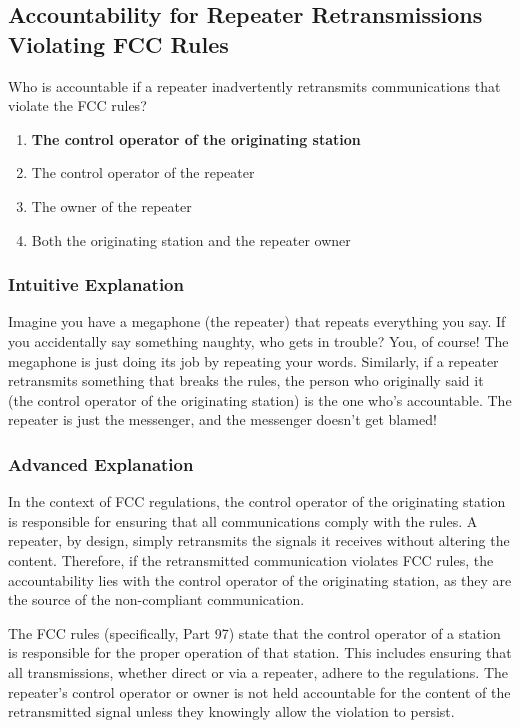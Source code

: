 \subsection{Accountability for Repeater Retransmissions Violating FCC Rules}
\label{T1F10}

\begin{tcolorbox}[colback=gray!10!white,colframe=black!75!black,title=T1F10]
Who is accountable if a repeater inadvertently retransmits communications that violate the FCC rules?
\begin{enumerate}[label=\Alph*)]
    \item \textbf{The control operator of the originating station}
    \item The control operator of the repeater
    \item The owner of the repeater
    \item Both the originating station and the repeater owner
\end{enumerate}
\end{tcolorbox}

\subsubsection{Intuitive Explanation}
Imagine you have a megaphone (the repeater) that repeats everything you say. If you accidentally say something naughty, who gets in trouble? You, of course! The megaphone is just doing its job by repeating your words. Similarly, if a repeater retransmits something that breaks the rules, the person who originally said it (the control operator of the originating station) is the one who’s accountable. The repeater is just the messenger, and the messenger doesn’t get blamed!

\subsubsection{Advanced Explanation}
In the context of FCC regulations, the control operator of the originating station is responsible for ensuring that all communications comply with the rules. A repeater, by design, simply retransmits the signals it receives without altering the content. Therefore, if the retransmitted communication violates FCC rules, the accountability lies with the control operator of the originating station, as they are the source of the non-compliant communication.

The FCC rules (specifically, Part 97) state that the control operator of a station is responsible for the proper operation of that station. This includes ensuring that all transmissions, whether direct or via a repeater, adhere to the regulations. The repeater’s control operator or owner is not held accountable for the content of the retransmitted signal unless they knowingly allow the violation to persist.

